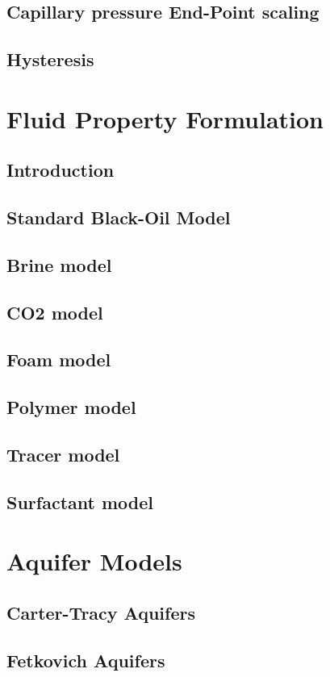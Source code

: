\documentclass{elsarticle}
\begin{document}
\subsection{Capillary pressure End-Point scaling}
\subsection{Hysteresis}

\section{Fluid Property Formulation}
\subsection{Introduction}
\subsection{Standard Black-Oil Model}
\subsection{Brine model}
\subsection{CO2 model}
\subsection{Foam model}
\subsection{Polymer model}
\subsection{Tracer model}
\subsection{Surfactant model}

\section{Aquifer Models}
\subsection{Carter-Tracy Aquifers}
\subsection{Fetkovich Aquifers}
\end{document}
